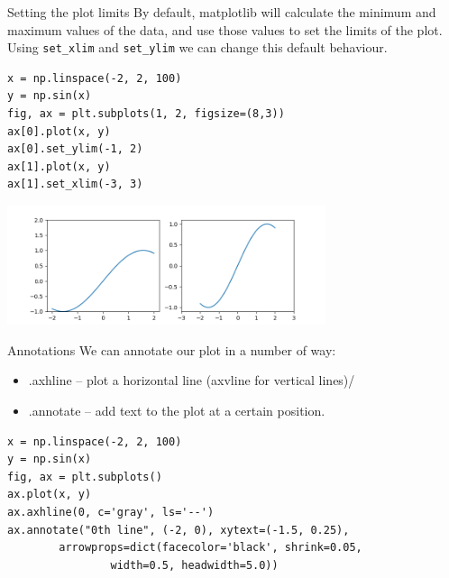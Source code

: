 \documentclass[10pt]{beamer}
\begin{document}
\begin{frame}[label={sec:orgea3b10d},fragile]{Setting the plot limits}
 By default, matplotlib will calculate the minimum and maximum values of the
data, and use those values to set the limits of the plot. Using \texttt{set\_xlim} and
\texttt{set\_ylim} we can change this default behaviour.

\begin{verbatim}
x = np.linspace(-2, 2, 100)
y = np.sin(x)
fig, ax = plt.subplots(1, 2, figsize=(8,3))
ax[0].plot(x, y)
ax[0].set_ylim(-1, 2)
ax[1].plot(x, y)
ax[1].set_xlim(-3, 3)
\end{verbatim}

\begin{center}
\includegraphics[width=0.7\textwidth]{images/limits.png}
\end{center}
\end{frame}

\begin{frame}[label={sec:org770a815},fragile]{Annotations}
 We can annotate our plot in a number of way:
\begin{itemize}
\item .axhline -- plot a horizontal line (axvline for vertical lines)/
\item .annotate -- add text to the plot at a certain position.
\end{itemize}

\begin{verbatim}
x = np.linspace(-2, 2, 100)
y = np.sin(x)
fig, ax = plt.subplots()
ax.plot(x, y)
ax.axhline(0, c='gray', ls='--')
ax.annotate("0th line", (-2, 0), xytext=(-1.5, 0.25),
	    arrowprops=dict(facecolor='black', shrink=0.05,
			    width=0.5, headwidth=5.0))
\end{verbatim}
\end{frame}
\end{document}
